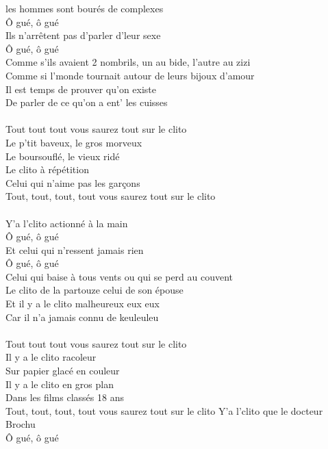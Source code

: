 
 les hommes sont bourés de complexes
\\Ô gué, ô gué
\\Ils n'arrêtent pas d'parler d'leur sexe 
\\Ô gué, ô gué
\\Comme s'ils avaient 2 nombrils, un au bide, l'autre au zizi
\\Comme si l'monde tournait autour de leurs bijoux d'amour
\\Il est temps de prouver qu'on existe
\\De parler de ce qu'on a ent' les cuisses
\\\\Tout tout tout vous saurez tout sur le clito
\\Le p'tit baveux, le gros morveux
\\Le boursouflé, le vieux ridé
\\Le clito à répétition
\\Celui qui n'aime pas les garçons
\\Tout, tout, tout, tout vous saurez tout sur le clito
\\\\Y'a l'clito actionné à la main 
\\Ô gué, ô gué
\\Et celui qui n'ressent jamais rien 
\\Ô gué, ô gué
\\Celui qui baise à tous vents ou qui se perd au couvent
\\Le clito de la partouze celui de son épouse
\\Et il y a le clito malheureux eux eux
\\Car il n'a jamais connu de keuleuleu
\\\\Tout tout tout vous saurez tout sur le clito
\\Il y a le clito racoleur
\\Sur papier glacé en couleur
\\Il y a le clito en gros plan
\\Dans les films classés 18 ans
\\Tout, tout, tout, tout vous saurez tout sur le clito
\breakpage
Y'a l'clito que le docteur Brochu 
\\Ô gué, ô gué
